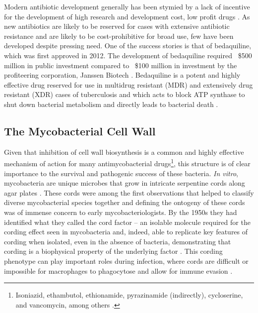 Modern antibiotic development generally has been stymied by a lack of incentive for the development of high research and development cost, low profit drugs \citep{Joshi2011}. As new antibiotics are likely to be reserved for cases with extensive antibiotic resistance and are likely to be cost\hyp{}prohibitive for broad use, few have been developed despite pressing need. One of the success stories is that of bedaquiline, which was first approved in 2012. The development of bedaquiline required ~\$500 million in public investment compared to ~\$100 million in investment by the profiteering corporation, Janssen Biotech \citep{Gotham2020, Leibert2014, Osborne2013}. Bedaquiline is a potent and highly effective drug reserved for use in multidrug resistant (MDR) and extensively drug resistant (XDR) cases of tuberculosis and which acts to block ATP synthase to shut down bacterial metabolism and directly leads to bacterial death \citep{Nguyen2018, Sarathy2019}. 

\subsection{The Mycobacterial Cell Wall}\label{cellwall}

Given that inhibition of cell wall biosynthesis is a common and highly effective mechanism of action for many antimycobacterial drugs\footnote{Isoniazid, ethambutol, ethionamide, pyrazinamide (indirectly), cycloserine, and vancomycin, among others \citep{Nataraj2015}.}, this structure is of clear importance to the survival and pathogenic success of these bacteria. \textit{In vitro}, mycobacteria are unique microbes that grow in intricate serpentine cords along agar plates \citep{Koch1882, Glickman2000}. These cords were among the first observations that helped to classify diverse mycobacterial species together and defining the ontogeny of these cords was of immense concern to early mycobacteriologists. By the 1950s they had identified what they called the cord factor -- an isolable molecule required for the cording effect seen in mycobacteria and, indeed, able to replicate key features of cording when isolated, even in the absence of bacteria, demonstrating that cording is a biophysical property of the underlying factor \citep{Bloch1955, Bloch1953, Sorkin1952, Hunter2006a, Behling1993}. This cording phenotype can play important roles during infection, where cords are difficult or impossible for macrophages to phagocytose and allow for immune evasion \citep{Bernut2014, Ufimtseva2018}. 

